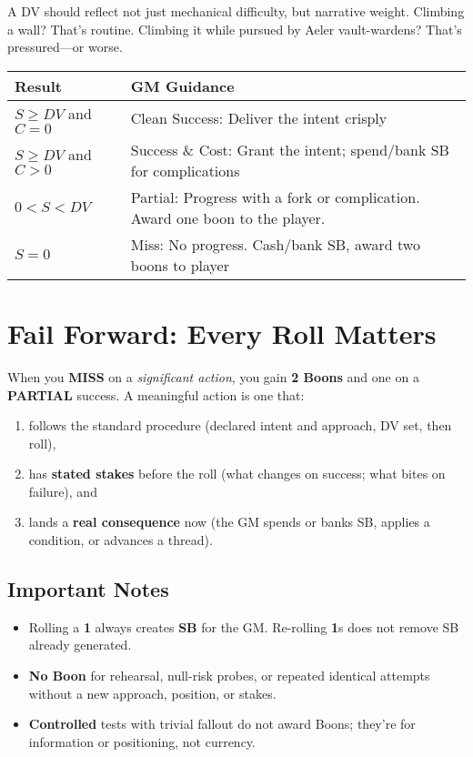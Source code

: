 A DV should reflect not just mechanical difficulty, but narrative weight. Climbing a wall? That's routine. Climbing it while pursued by Aeler vault-wardens? That's pressured---or worse.

\begin{fatebox}
\begin{tabularx}{\textwidth}{lX}
\toprule
\textbf{Result} & \textbf{GM Guidance} \\
\midrule
$S \geq DV$ and $C = 0$ & Clean Success: Deliver the intent crisply \\
$S \geq DV$ and $C > 0$ & Success \& Cost: Grant the intent; spend/bank SB for complications \\
$0 < S < DV$ & Partial: Progress with a fork or complication. Award one boon to the player. \\
$S = 0$ & Miss: No progress. Cash/bank SB, award two boons to player \\
\bottomrule
\end{tabularx}
\end{fatebox}

\section{Fail Forward: Every Roll Matters}

When you \textbf{MISS} on a \emph{significant action}, you gain \textbf{2 Boons} and one on a \textbf{PARTIAL} success. A meaningful action is one that:
\begin{enumerate}
  \item follows the standard procedure (declared intent and approach, DV set, then roll), 
  \item has \textbf{stated stakes} before the roll (what changes on success; what bites on failure), and
  \item lands a \textbf{real consequence} now (the GM spends or banks SB, applies a condition, or advances a thread).
\end{enumerate}

\subsection{Important Notes}
\begin{itemize}
  \item Rolling a \textbf{1} always creates \textbf{SB} for the GM. Re-rolling \textbf{1}s does not remove SB already generated.
  \item \textbf{No Boon} for rehearsal, null-risk probes, or repeated identical attempts without a new approach, position, or stakes.
  \item \textbf{Controlled} tests with trivial fallout do not award Boons; they're for information or positioning, not currency.
\end{itemize}

